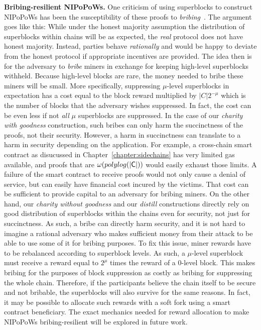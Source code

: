 \textbf{Bribing-resilient NIPoPoWs.} One criticism of using superblocks to
construct NIPoPoWs has been the susceptibility of these proofs to
\emph{bribing}~\cite{flyclient}. The argument goes like this: While under the
honest majority assumption the distribution of superblocks within chains will be
as expected, the \emph{real} protocol does not have honest majority. Instead,
parties behave \emph{rationally} and would be happy to deviate from the honest
protocol if appropriate incentives are provided. The idea then is for the
adversary to \emph{bribe} miners in exchange for keeping high-level superblocks
withheld. Because high-level blocks are rare, the money needed to bribe these
miners will be small. More specifically, suppressing $\mu$-level superblocks
in expectation has a cost equal to the block reward multiplied by
$|C|2^{-\mu}$ which is the number of blocks that the adversary wishes
suppressed. In fact, the cost can be even less if not \emph{all} $\mu$
superblocks are suppressed. In the case of our \emph{charity with goodness}
construction, such bribes can only harm the succinctness of the proofs, not
their security. However, a harm in succinctness can translate to a harm in
security depending on the application. For example, a cross-chain smart contract
as disucussed in Chapter~\ref{chapter:sidechains} has very limited gas
available, and proofs that are $\omega(polylog(|\mathsf{C}|))$ would easily exhaust
those limits. A failure of the smart contract to receive proofs would not only
cause a denial of service, but can easily have financial cost incured by the
victims. That cost can be sufficient to provide capital to an adversary for
bribing miners. On the other hand, our \emph{charity without goodness} and our
\emph{distill} constructions directly rely on good distribution of superblocks
within the chains even for security, not just for succinctness. As such, a bribe
can directly harm security, and it is not hard to imagine a rational adversary
who makes sufficient money from their attack to be able to use some of it for
bribing purposes. To fix this issue, miner rewards have to be rebalanced
according to superblock levels. As such, a $\mu$-level superblock must receive
a reward equal to $2^\mu$ times the reward of a $0$-level block. This makes
bribing for the purposes of block suppression as costly as bribing for
suppressing the whole chain. Therefore, if the participants believe the chain
itself to be secure and not bribable, the superblocks will also survive for the
same reasons. In fact, it may be possible to allocate such rewards with a soft
fork using a smart contract beneficiary. The exact mechanics needed for reward
allocation to make NIPoPoWs bribing-resilient will be explored in future work.
